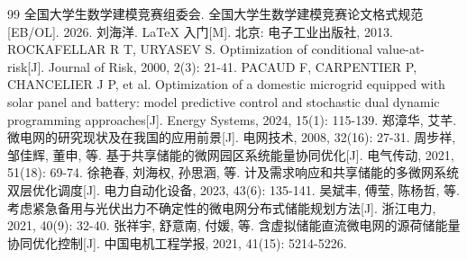 \documentclass[withoutpreface]{cumcmthesis}
\begin{document}



\begin{thebibliography}{99}
     全国大学生数学建模竞赛组委会. 全国大学生数学建模竞赛论文格式规范[EB/OL]. 2026.
     刘海洋. \LaTeX{} 入门[M]. 北京: 电子工业出版社, 2013.
     ROCKAFELLAR R T, URYASEV S. Optimization of conditional value-at-risk[J]. Journal of Risk, 2000, 2(3): 21-41.
     PACAUD F, CARPENTIER P, CHANCELIER J P, et al. Optimization of a domestic microgrid equipped with solar panel and battery: model predictive control and stochastic dual dynamic programming approaches[J]. Energy Systems, 2024, 15(1): 115-139.
     郑漳华, 艾芊. 微电网的研究现状及在我国的应用前景[J]. 电网技术, 2008, 32(16): 27-31.
     周步祥, 邹佳辉, 董申, 等. 基于共享储能的微网园区系统能量协同优化[J]. 电气传动, 2021, 51(18): 69-74.
     徐艳春, 刘海权, 孙思涵, 等. 计及需求响应和共享储能的多微网系统双层优化调度[J]. 电力自动化设备, 2023, 43(6): 135-141.
     吴斌丰, 傅莹, 陈杨哲, 等. 考虑紧急备用与光伏出力不确定性的微电网分布式储能规划方法[J]. 浙江电力, 2021, 40(9): 32-40.
     张祥宇, 舒意南, 付媛, 等. 含虚拟储能直流微电网的源荷储能量协同优化控制[J]. 中国电机工程学报, 2021, 41(15): 5214-5226.
\end{thebibliography}
\end{document}
